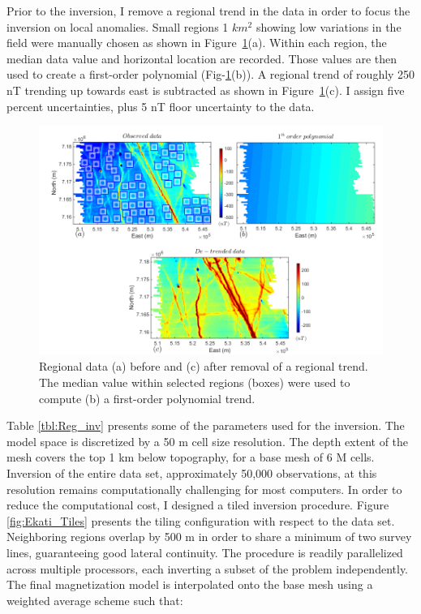 Prior to the inversion, I remove a regional trend in the data in order to focus the inversion on local anomalies. Small regions 1 $km^2$ showing low variations in the field were manually chosen as shown in Figure~\ref{fig:Ekati_Detrend_Data}(a). Within each region, the median data value and horizontal location are recorded. Those values are then used to create a first-order polynomial (Fig-\ref{fig:Ekati_Detrend_Data}(b)). A regional trend of roughly 250 nT trending up towards east is subtracted as shown in Figure~\ref{fig:Ekati_Detrend_Data}(c). I assign five percent uncertainties, plus 5 nT floor uncertainty to the data.   

\begin{figure}[h!]
\centering
\includegraphics[scale=0.55, trim= 1cm 0 0 0]{Ekati_Detrend_Data.png}
\caption{Regional data (a) before and (c) after removal of a regional trend. The median value within selected regions (boxes) were used to compute (b) a first-order polynomial trend.}
\label{fig:Ekati_Detrend_Data}
\end{figure}

Table \ref{tbl:Reg_inv} presents some of the parameters used for the inversion.
The model space is discretized by a 50 m cell size resolution.
The depth extent of the mesh covers the top 1 km below topography,  for a base mesh of 6 M cells.
Inversion of the entire data set, approximately 50,000 observations, at this resolution remains computationally challenging for most computers.
In order to reduce the computational cost, I designed a tiled inversion procedure. Figure \ref{fig:Ekati_Tiles} presents the tiling configuration with respect to the data set.
Neighboring regions overlap by 500 m in order to share a minimum of two survey lines, guaranteeing good lateral continuity.
The procedure is readily parallelized across multiple processors, each inverting a subset of the problem independently.
The final magnetization model is interpolated onto the base mesh using a weighted average scheme such that:

